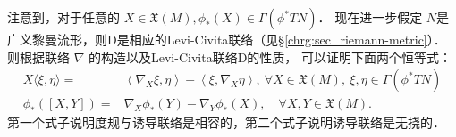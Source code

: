 注意到，对于任意的 $X \in \mathfrak{X}(M), \phi_*(X) \in \Gamma(\phi^* T N)$．
现在进一步假定 $N$是广义黎曼流形，则$\mathrm{D}$是相应的Levi-Civita联络（见\S\ref{chrg:sec_riemann-metric}）．
则根据联络 $\nabla$ 的构造以及Levi-Civita联络$\mathrm{D}$的性质，
可以证明下面两个恒等式：
\begin{align}
    X\langle\xi, \eta\rangle= &\left\langle\nabla_X \xi, \eta\right\rangle+\left\langle\xi,
     \nabla_X \eta\right\rangle, \ \forall X \in \mathfrak{X}(M),\ \xi, \eta \in \Gamma(\phi^* T N) 
     \label{chfb:eqn_induce-con-compatibility} \\
    \phi_*([X, Y])=&\nabla_X \phi_*(Y)-\nabla_Y \phi_*(X), \quad \forall X, Y \in \mathfrak{X}(M) .
    \label{chfb:eqn_induce-con-NoTorsion}
\end{align}
第一个式子说明度规与诱导联络是相容的，第二个式子说明诱导联络是无挠的．


